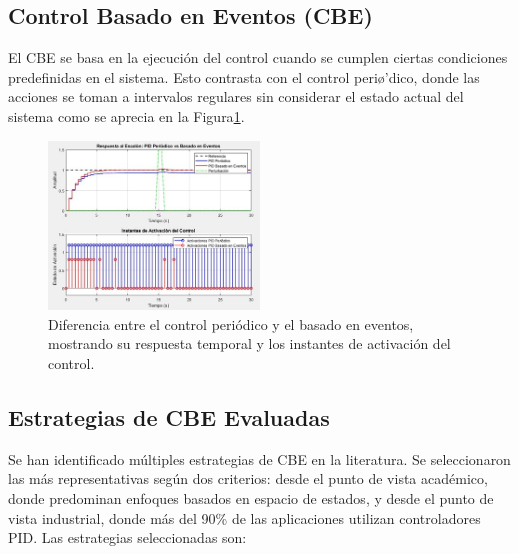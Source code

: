\documentclass[conference]{IEEEtran}
\begin{document}
\subsection{Control Basado en Eventos (CBE)}
El CBE se basa en la ejecuci\'on del control cuando se cumplen ciertas condiciones predefinidas en el sistema\cite{Lunze2010}. Esto contrasta con el control peri\o'dico, donde las acciones se toman a intervalos regulares sin considerar el estado actual del sistema como se aprecia en la Figura\ref{fig:figura1}.
\begin{figure}[h]
    \centering
    \includegraphics[width=0.5\textwidth]{eventvsperiod}
    \caption{Diferencia entre el control peri\'odico y el basado en eventos, mostrando su respuesta temporal y los instantes de activaci\'on del control.}
    \label{fig:figura1}
\end{figure}
\subsection{Estrategias de CBE Evaluadas}
Se han identificado m\'ultiples estrategias de CBE en la literatura\cite{Heemels2012}. Se seleccionaron las m\'as representativas seg\'un dos criterios: desde el punto de vista acad\'emico\cite{Aranda2020}, donde predominan enfoques basados en espacio de estados, y desde el punto de vista industrial, donde m\'as del 90\% de las aplicaciones utilizan controladores PID. Las estrategias seleccionadas son:
\end{document}
